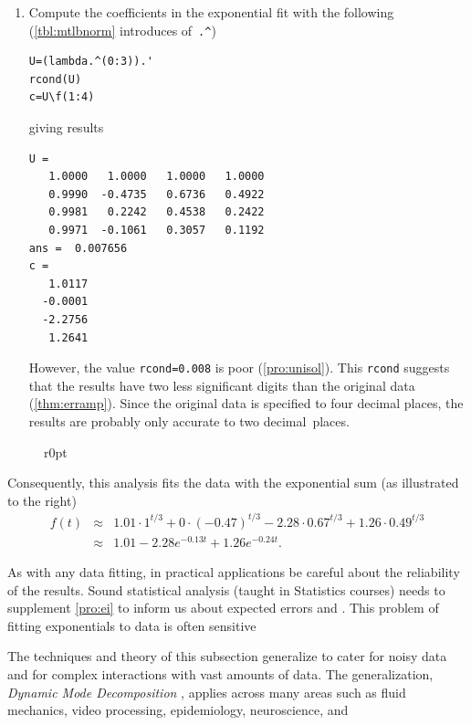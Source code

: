 \begin{example}
\begin{solution}
\begin{enumerate}
\item Compute the coefficients in the exponential fit with the following (\cref{tbl:mtlbnorm} introduces  of~\verb|.^|)
\begin{verbatim}
U=(lambda.^(0:3)).'
rcond(U)
c=U\f(1:4)
\end{verbatim}
giving results
\begin{verbatim}
U =
   1.0000   1.0000   1.0000   1.0000
   0.9990  -0.4735   0.6736   0.4922
   0.9981   0.2242   0.4538   0.2422
   0.9971  -0.1061   0.3057   0.1192
ans =  0.007656
c =
   1.0117
  -0.0001
  -2.2756
   1.2641
\end{verbatim}
However, the value \verb|rcond=0.008| is poor (\cref{pro:unisol}).
This \verb|rcond| suggests that the results have two less significant digits than the original data (\cref{thm:erramp}).
Since the original data is specified to four decimal places, the results are probably only accurate to two decimal~places.
\end{enumerate}

\begin{figure}r{0pt}  \end{figure}
Consequently, this analysis fits the data with the exponential sum (as illustrated to the right)
\begin{eqnarray*}
f(t)&\approx&1.01\cdot1^{t/3}+0\cdot(-0.47)^{t/3}
-2.28\cdot0.67^{t/3}+1.26\cdot0.49^{t/3}
\\&\approx&1.01-2.28e^{-0.13t}+1.26e^{-0.24t}.
\end{eqnarray*}
\end{solution}
\end{example}


As with any data fitting, in practical applications be careful about the reliability of the results.
Sound statistical analysis (taught in Statistics courses) needs to supplement \cref{pro:ei} to inform us about expected errors and .
This problem of fitting exponentials to data is often sensitive 

The techniques and theory of this subsection generalize to cater for noisy data and for complex  interactions with vast amounts of data.
The generalization, \emph{Dynamic Mode Decomposition} \cite[e.g.,][]{Kutz2016},  applies across many areas such as fluid mechanics, video processing, epidemiology, neuroscience, and 












